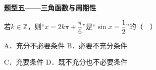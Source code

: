 \documentclass[12pt,a4paper]{article}
\newcommand{\qtitle}[1]{{\Large\bfseries\color[HTML]{1F3864}#1}\par\vspace{0.9em}}
\begin{document}
\qtitle{题型五——三角函数与周期性}

若$k\in\mathbb{Z}$，则“$x=2k\pi+\dfrac{\pi}{6}$”是“$\sin x=\dfrac{1}{2}$”的（　）\par
\vspace{0.9em}
A．充分不必要条件 \qquad\qquad B．必要不充分条件\par
\vspace{0.45em}
C．充要条件 \qquad\qquad D．既不充分也不必要条件\par
\vspace{0.45em}
\end{document}
